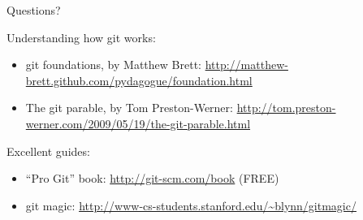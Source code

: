 \documentclass{beamer}
\newcommand{\git}{git\xspace}
\begin{document}

\begin{frame}{}
  
  {\centering \LARGE \alert{Questions?}
  
  }
  \vspace*{8mm}
  Understanding how \git works:
  \begin{itemize}
  \item \git foundations, by Matthew Brett:
    \small
    \url{http://matthew-brett.github.com/pydagogue/foundation.html}
  \item  The \git parable, by Tom Preston-Werner:
    \small
  \url{http://tom.preston-werner.com/2009/05/19/the-git-parable.html}
  \end{itemize}
  \vspace*{1em}
  Excellent guides:
  \begin{itemize}
  \item ``Pro Git'' book: \url{http://git-scm.com/book} (FREE)
  \item \git magic: \url{http://www-cs-students.stanford.edu/~blynn/gitmagic/}
  \end{itemize}
\end{frame}


\appendix

\end{document}
